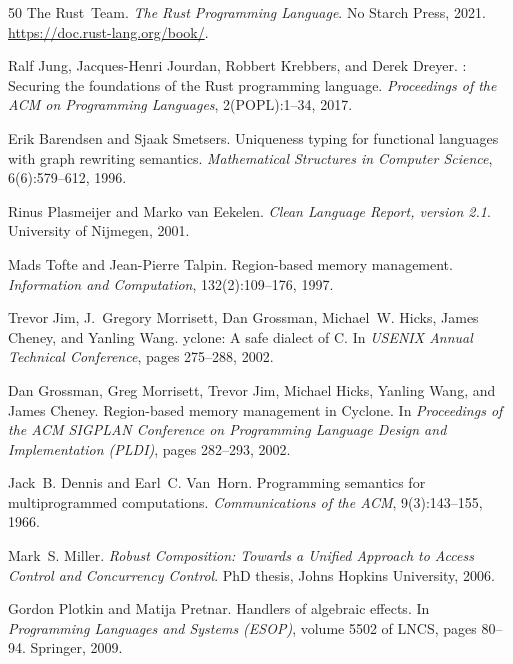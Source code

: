 \documentclass[11pt]{article}
\begin{document}
\begin{thebibliography}{50}
The Rust~Team.
\newblock \emph{The Rust Programming Language}.
\newblock No Starch Press, 2021.
\newblock \url{https://doc.rust-lang.org/book/}.

Ralf Jung, Jacques-Henri Jourdan, Robbert Krebbers, and Derek Dreyer.
: Securing the foundations of the {R}ust programming language.
\newblock \emph{Proceedings of the ACM on Programming Languages}, 2(POPL):1--34, 2017.

Erik Barendsen and Sjaak Smetsers.
\newblock Uniqueness typing for functional languages with graph rewriting semantics.
\newblock \emph{Mathematical Structures in Computer Science}, 6(6):579--612, 1996.

Rinus Plasmeijer and Marko van Eekelen.
\newblock \emph{Clean Language Report, version 2.1}.
\newblock University of Nijmegen, 2001.

Mads Tofte and Jean-Pierre Talpin.
\newblock Region-based memory management.
\newblock \emph{Information and Computation}, 132(2):109--176, 1997.

Trevor Jim, J.~Gregory Morrisett, Dan Grossman, Michael~W. Hicks, James Cheney, and Yanling Wang.
yclone: A safe dialect of {C}.
\newblock In \emph{USENIX Annual Technical Conference}, pages 275--288, 2002.

Dan Grossman, Greg Morrisett, Trevor Jim, Michael Hicks, Yanling Wang, and James Cheney.
\newblock Region-based memory management in {C}yclone.
\newblock In \emph{Proceedings of the ACM SIGPLAN Conference on Programming Language Design and Implementation (PLDI)}, pages 282--293, 2002.

Jack~B. Dennis and Earl~C. Van~Horn.
\newblock Programming semantics for multiprogrammed computations.
\newblock \emph{Communications of the ACM}, 9(3):143--155, 1966.

Mark~S. Miller.
\newblock \emph{Robust Composition: Towards a Unified Approach to Access Control and Concurrency Control}.
\newblock PhD thesis, Johns Hopkins University, 2006.

Gordon Plotkin and Matija Pretnar.
\newblock Handlers of algebraic effects.
\newblock In \emph{Programming Languages and Systems (ESOP)}, volume 5502 of LNCS, pages 80--94. Springer, 2009.


\end{thebibliography}
\end{document}
